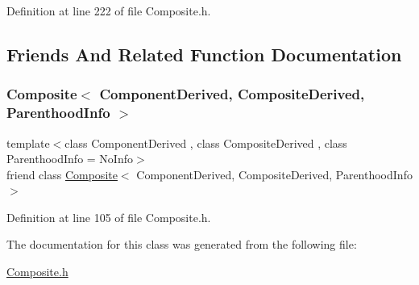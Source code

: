 Definition at line 222 of file Composite.\+h.



\subsection{Friends And Related Function Documentation}
\hypertarget{classocra_1_1Parenthood_a157fe78169803ffbbb7290a687e96f5e}{}\label{classocra_1_1Parenthood_a157fe78169803ffbbb7290a687e96f5e} 
\subsubsection{\texorpdfstring{Composite$<$ Component\+Derived, Composite\+Derived, Parenthood\+Info $>$}{Composite< ComponentDerived, CompositeDerived, ParenthoodInfo >}}
{\footnotesize\ttfamily template$<$class Component\+Derived , class Composite\+Derived , class Parenthood\+Info  = No\+Info$>$ \\
friend class \hyperlink{classocra_1_1Composite}{Composite}$<$ Component\+Derived, Composite\+Derived, Parenthood\+Info $>$\hspace{0.3cm}{\ttfamily [friend]}}



Definition at line 105 of file Composite.\+h.



The documentation for this class was generated from the following file\+:\begin{DoxyCompactItemize}
\item 
\hyperlink{Composite_8h}{Composite.\+h}\end{DoxyCompactItemize}
